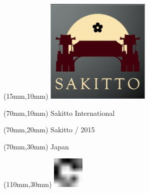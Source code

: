 \null\newpage
\begin{textblock*}{50mm}(15mm,10mm)%
\includegraphics[width=50mm]{LG/2015-05-20_00093.png}
\end{textblock*}
\begin{textblock*}{130mm}(70mm,10mm)%
{\fontsize{20}{20}\selectfont Sakitto International}\\
\end{textblock*}
\begin{textblock*}{120mm}(70mm,20mm)%
{\fontsize{16}{16}\selectfont Sakitto / 2015}\\
\end{textblock*}
\begin{textblock*}{120mm}(70mm,30mm)%
{\fontsize{12}{12}\selectfont Japan}
\end{textblock*}
\begin{textblock*}{30mm}(110mm,30mm)%
\centering
\includegraphics[height=15mm]{icons/fa-rotate-right.pdf}
\end{textblock*}
